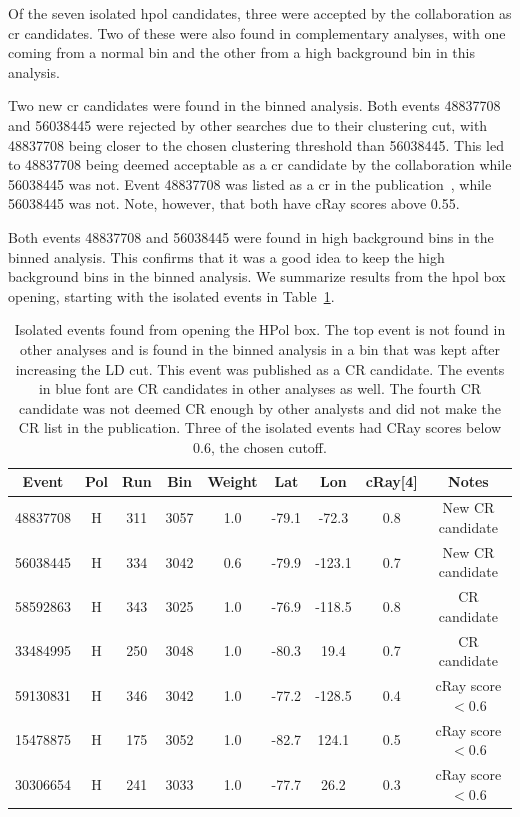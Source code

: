 Of the seven isolated \gls{hpol} candidates, three were accepted by the collaboration as \gls{cr} candidates. Two of these were also found in complementary analyses, with one coming from a normal bin and the other from a high background bin in this analysis. 

Two new \gls{cr} candidates were found in the binned analysis. Both events 48837708 and 56038445 were rejected by other searches due to their clustering cut, with 48837708 being closer to the chosen clustering threshold than 56038445. This led to 48837708 being deemed acceptable as a \gls{cr} candidate by the collaboration while 56038445 was not. Event 48837708 was listed as a \gls{cr} in the publication~\cite{diffuse}, while 56038445 was not. Note, however, that both have cRay scores above 0.55. 

Both events 48837708 and 56038445 were found in high background bins in the binned analysis. This confirms that it was a good idea to keep the high background bins in the binned analysis. 
We summarize results from the \gls{hpol} box opening, starting with the isolated events in Table~\ref{isolated_table}. 

\begin{table}
\centering
\begin{tabular}{ |c|c|c|c|c|c|c|c|c| } 
 \hline
Event & Pol & Run & Bin & Weight & Lat & Lon & cRay[4] & Notes \\
\hline
48837708 & H & 311 & 3057 & 1.0 & -79.1 & -72.3 & 0.8 &{\color{red} New CR candidate} \\
56038445 & H & 334 & 3042 & 0.6 & -79.9 & -123.1 & 0.7 & New CR candidate \\
58592863 & H & 343 & 3025 & 1.0 & -76.9 & -118.5 & 0.8 & {\color{blue} CR candidate} \\
33484995 & H & 250 & 3048 & 1.0 & -80.3 & 19.4 & 0.7 & {\color{blue} CR candidate} \\	
59130831 & H & 346 & 3042 & 1.0 & -77.2 & -128.5 & 0.4 & cRay score $<0.6$ \\	
15478875 & H & 175 & 3052 & 1.0 & -82.7 & 124.1 & 0.5 &	cRay score $<0.6$\\
30306654 & H & 241 & 3033 & 1.0 & -77.7 & 26.2 & 0.3 & cRay score $<0.6$	 \\
\hline
\end{tabular}
\caption{Isolated events found from opening the HPol box. The top event is not found in other analyses and is found in the binned analysis in a bin that was kept after increasing the LD cut. This event was published as a CR candidate. The events in blue font are CR candidates in other analyses as well. The fourth CR candidate was not deemed CR enough by other analysts and did not make the CR list in the publication. Three of the isolated events had CRay scores below $0.6$, the chosen cutoff.}
\label{isolated_table}
\end{table}

